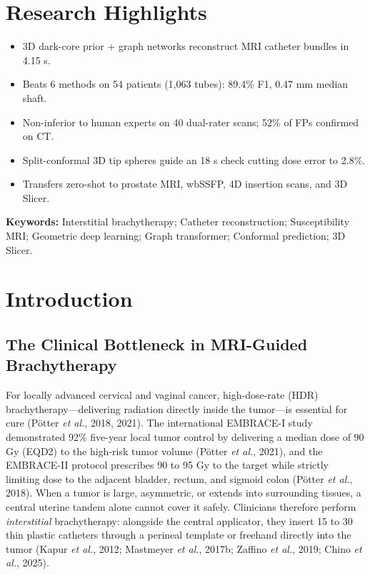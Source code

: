 \documentclass[
  11pt,
]{article}
\providecommand{\tightlist}{%
  \setlength{\itemsep}{0pt}\setlength{\parskip}{0pt}}
\begin{document}
\section*{Research Highlights}\label{research-highlights}

\begin{itemize}
\tightlist
\item
  3D dark-core prior + graph networks reconstruct MRI catheter bundles
  in 4.15 s.
\item
  Beats 6 methods on 54 patients (1,063 tubes): 89.4\% F1, 0.47 mm
  median shaft.
\item
  Non-inferior to human experts on 40 dual-rater scans; 52\% of FPs
  confirmed on CT.
\item
  Split-conformal 3D tip spheres guide an 18 s check cutting dose error
  to 2.8\%.
\item
  Transfers zero-shot to prostate MRI, wbSSFP, 4D insertion scans, and
  3D Slicer.
\end{itemize}

\textbf{Keywords:} Interstitial brachytherapy; Catheter reconstruction;
Susceptibility MRI; Geometric deep learning; Graph transformer;
Conformal prediction; 3D Slicer.

\section{Introduction}\label{introduction}

\subsection{The Clinical Bottleneck in MRI-Guided
Brachytherapy}\label{the-clinical-bottleneck-in-mri-guided-brachytherapy}

For locally advanced cervical and vaginal cancer, high-dose-rate (HDR)
brachytherapy---delivering radiation directly inside the tumor---is
essential for cure (Pötter \emph{et al.}, 2018, 2021). The international
EMBRACE-I study demonstrated 92\% five-year local tumor control by
delivering a median dose of 90 Gy (EQD2) to the high-risk tumor volume
(Pötter \emph{et al.}, 2021), and the EMBRACE-II protocol prescribes 90
to 95 Gy to the target while strictly limiting dose to the adjacent
bladder, rectum, and sigmoid colon (Pötter \emph{et al.}, 2018). When a
tumor is large, asymmetric, or extends into surrounding tissues, a
central uterine tandem alone cannot cover it safely. Clinicians
therefore perform \emph{interstitial} brachytherapy: alongside the
central applicator, they insert 15 to 30 thin plastic catheters through
a perineal template or freehand directly into the tumor (Kapur \emph{et
al.}, 2012; Mastmeyer \emph{et al.}, 2017b; Zaffino \emph{et al.}, 2019;
Chino \emph{et al.}, 2025).
\end{document}
